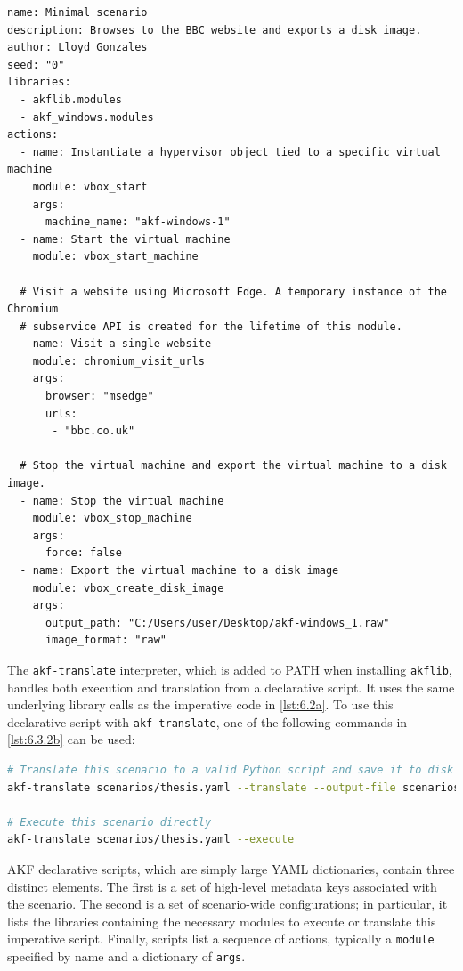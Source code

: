 \documentclass[letterpaper,12pt]{report}
\newcommand{\passthrough}[1]{#1}
\begin{document}
\begin{lstlisting}[label={lst:6.3.2a}, caption={Example of a declarative AKF scenario}, ]
name: Minimal scenario
description: Browses to the BBC website and exports a disk image.
author: Lloyd Gonzales
seed: "0"
libraries:
  - akflib.modules
  - akf_windows.modules
actions:
  - name: Instantiate a hypervisor object tied to a specific virtual machine
    module: vbox_start
    args:
      machine_name: "akf-windows-1"
  - name: Start the virtual machine
    module: vbox_start_machine

  # Visit a website using Microsoft Edge. A temporary instance of the Chromium
  # subservice API is created for the lifetime of this module.
  - name: Visit a single website
    module: chromium_visit_urls
    args:
      browser: "msedge"
      urls: 
       - "bbc.co.uk"

  # Stop the virtual machine and export the virtual machine to a disk image.
  - name: Stop the virtual machine
    module: vbox_stop_machine
    args:
      force: false
  - name: Export the virtual machine to a disk image
    module: vbox_create_disk_image
    args:
      output_path: "C:/Users/user/Desktop/akf-windows_1.raw"
      image_format: "raw"
\end{lstlisting}

The \passthrough{\lstinline!akf-translate!} interpreter, which is added
to PATH when installing \passthrough{\lstinline!akflib!}, handles both
execution and translation from a declarative script. It uses the same
underlying library calls as the imperative code in \autoref{lst:6.2a}.
To use this declarative script with
\passthrough{\lstinline!akf-translate!}, one of the following commands
in \autoref{lst:6.3.2b} can be used:

\begin{lstlisting}[label={lst:6.3.2b}, caption={Sample usage of the akf-translate utility}, language=sh]
# Translate this scenario to a valid Python script and save it to disk
akf-translate scenarios/thesis.yaml --translate --output-file scenarios/thesis.py

# Execute this scenario directly
akf-translate scenarios/thesis.yaml --execute
\end{lstlisting}

AKF declarative scripts, which are simply large YAML dictionaries,
contain three distinct elements. The first is a set of high-level
metadata keys associated with the scenario. The second is a set of
scenario-wide configurations; in particular, it lists the libraries
containing the necessary modules to execute or translate this imperative
script. Finally, scripts list a sequence of actions, typically a
\passthrough{\lstinline!module!} specified by name and a dictionary of
\passthrough{\lstinline!args!}.
\end{document}
